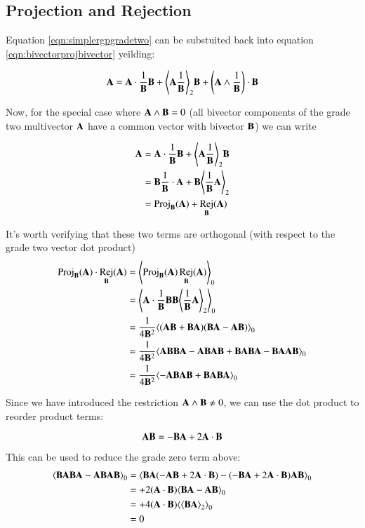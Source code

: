 \documentclass{article}      %
\DeclareMathOperator{\Rej}{Rej}
\newcommand{\gpgrade}[2] {{\left\langle{{#1}}\right\rangle}_{#2}}
\newcommand{\gpgradezero}[1] {\gpgrade{#1}{0}}
\newcommand{\gpgradetwo}[1] {\gpgrade{#1}{2}}
\begin{document}
\subsection{ Projection and Rejection }

Equation \ref{eqn:simplergpgradetwo} can be substuited back into equation \ref{eqn:bivectorprojbivector} yeilding:

\begin{equation}\label{eqn:simplerbivectorprojbivector}
\BA =
\BA \cdot \inv{\BB} \BB \\
+\gpgradetwo{\BA\inv\BB} \BB
+\left(\BA \wedge \inv{\BB}\right) \cdot \BB 
\end{equation}

Now, for the special case where $\mathbf{A} \wedge \mathbf{B} = 0$ (all bivector components of the grade two multivector $\mathbf{A}$ have a common vector with bivector $\mathbf{B}$) we can write

\begin{align*}
\BA 
&= \BA \cdot \inv{\BB} \BB +\gpgradetwo{\BA\inv{\BB}} \BB \\
&= \BB \inv{\BB} \cdot {\BA} + \BB \gpgradetwo{\inv{\BB}\BA} \\
&= \Proj_{\BB}(\BA) + \Rej_{\BB}(\BA) \label{eqn:projrejbivectorbivector} \\
\end{align*}

It's worth verifying that these two terms are orthogonal (with respect to the grade two vector dot product)
\begin{align*}
\Proj_{\BB}(\BA) \cdot \Rej_{\BB}(\BA)
&= \gpgradezero{ \Proj_{\BB}(\BA) \Rej_{\BB}(\BA) } \\
&= \gpgradezero{ \BA \cdot \inv{\BB} \BB \BB \gpgradetwo{\inv{\BB}\BA} } \\
&= \inv{4\BB^2}\gpgradezero{ (\BA\BB + \BB\BA)(\BB\BA - \BA\BB) } \\
&= \inv{4\BB^2}\gpgradezero{ \BA\BB\BB\BA -\BA\BB\BA\BB +\BB\BA\BB\BA -\BB\BA\BA\BB } \\
&= \inv{4\BB^2}\gpgradezero{ -\BA\BB\BA\BB +\BB\BA\BB\BA } \\
\end{align*}

Since we have introduced the restriction 
$\mathbf{A} \wedge \mathbf{B} \ne 0$, we can 
use the dot product to reorder product terms:

\[
\mathbf{A}\mathbf{B} = -\mathbf{B}\mathbf{A} + 2 \mathbf{A} \cdot \mathbf{B}
\]

This can be used to reduce the grade zero term above:
\begin{align*}
\gpgradezero{ \BB\BA\BB\BA -\BA\BB\BA\BB }
&= \gpgradezero{ \BB\BA(-\BA\BB + 2 \BA \cdot \BB) -(-\BB\BA + 2 \BA \cdot \BB)\BA\BB } \\
&= + 2 (\BA \cdot \BB)\gpgradezero{\BB\BA - \BA\BB } \\
&= + 4 (\BA \cdot \BB)\gpgradezero{\gpgradetwo{\BB\BA}} \\
&= 0 \\
\end{align*}
\end{document}
